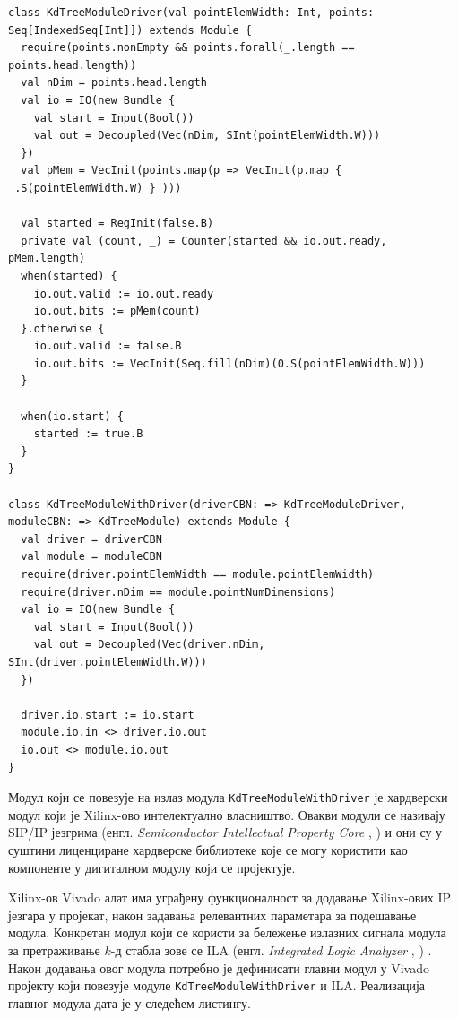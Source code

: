 \documentclass[master]{finthesis}
\makeatletter
\newcommand*{\engl}[2][\@empty]{%
    \edef\theacronym{#1}%
    (енгл. \foreignlanguage{english}{\emph{#2}%
    \ifx\theacronym\@empty \else , #1\fi})%
}
\newcommand*{\kd}{\texorpdfstring{$k$}{k}-д }
\newcommand*{\prog}[1]{\texttt{#1}}
\makeatother
\begin{document}
\begin{lstlisting}[style=Chisel, caption={Реализација драјвера модула за претраживање \kd стабла.}, label={lst:driver}]
class KdTreeModuleDriver(val pointElemWidth: Int, points: Seq[IndexedSeq[Int]]) extends Module {
  require(points.nonEmpty && points.forall(_.length == points.head.length))
  val nDim = points.head.length
  val io = IO(new Bundle {
    val start = Input(Bool())
    val out = Decoupled(Vec(nDim, SInt(pointElemWidth.W)))
  })
  val pMem = VecInit(points.map(p => VecInit(p.map { _.S(pointElemWidth.W) } )))

  val started = RegInit(false.B)
  private val (count, _) = Counter(started && io.out.ready, pMem.length)
  when(started) {
    io.out.valid := io.out.ready
    io.out.bits := pMem(count)
  }.otherwise {
    io.out.valid := false.B
    io.out.bits := VecInit(Seq.fill(nDim)(0.S(pointElemWidth.W)))
  }

  when(io.start) {
    started := true.B
  }
}

class KdTreeModuleWithDriver(driverCBN: => KdTreeModuleDriver, moduleCBN: => KdTreeModule) extends Module {
  val driver = driverCBN
  val module = moduleCBN
  require(driver.pointElemWidth == module.pointElemWidth)
  require(driver.nDim == module.pointNumDimensions)
  val io = IO(new Bundle {
    val start = Input(Bool())
    val out = Decoupled(Vec(driver.nDim, SInt(driver.pointElemWidth.W)))
  })

  driver.io.start := io.start
  module.io.in <> driver.io.out
  io.out <> module.io.out
}
\end{lstlisting}

Модул који се повезује на излаз модула \prog{KdTreeModuleWithDriver} је хардверски модул који је Xilinx-ово интелектуално власништво. Овакви модули се називају SIP\slash IP језгрима \engl{Semiconductor Intellectual Property Core} и они су у суштини лиценциране хардверске библиотеке које се могу користити као компоненте у дигиталном модулу који се пројектује.

Xilinx-ов Vivado алат има уграђену функционалност за додавање Xilinx-ових IP језгара у пројекат, након задавања релевантних параметара за подешавање модула. Конкретан модул који се користи за бележење излазних сигнала модула за претраживање \kd стабла зове се ILA \engl{Integrated Logic Analyzer}. Након додавања овог модула потребно је дефинисати главни модул у Vivado пројекту који повезује модуле \prog{KdTreeModuleWithDriver} и ILA. Реализација главног модула дата је у следећем листингу.
\end{document}
